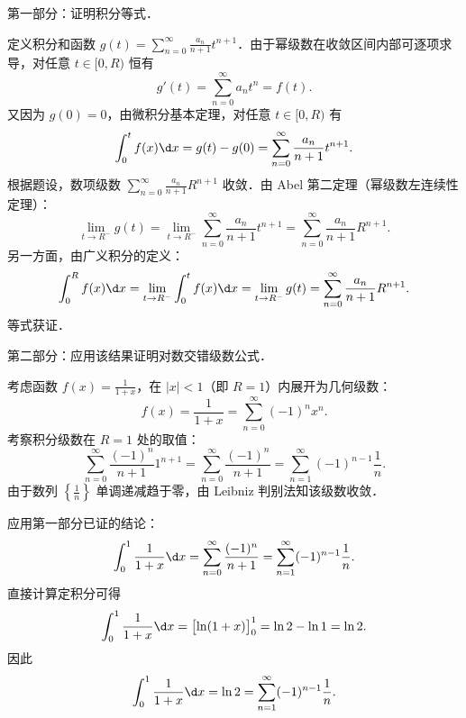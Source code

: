 \begin{myproof}
    第一部分：证明积分等式．

    定义积分和函数 $g(t) = \sum_{n=0}^\infty \frac{a_n}{n+1} t^{n+1}$．由于幂级数在收敛区间内部可逐项求导，对任意 $t \in [0, R)$ 恒有
    \begin{equation}
        g'(t) = \sum_{n=0}^\infty a_n t^n = f(t).
    \end{equation}
    又因为 $g(0) = 0$，由微积分基本定理，对任意 $t \in [0, R)$ 有
    \begin{equation}
        \int_0^t f(x)\d x = g(t) - g(0) = \sum_{n=0}^\infty \frac{a_n}{n+1} t^{n+1}.
    \end{equation}
    根据题设，数项级数 $\sum_{n=0}^\infty \frac{a_n}{n+1} R^{n+1}$ 收敛．由 Abel 第二定理（幂级数左连续性定理）：
    \begin{equation}
        \lim_{t \to R^-} g(t) = \lim_{t \to R^-} \sum_{n=0}^\infty \frac{a_n}{n+1} t^{n+1} = \sum_{n=0}^\infty \frac{a_n}{n+1} R^{n+1}.
    \end{equation}
    另一方面，由广义积分的定义：
    \begin{equation}
        \int_0^R f(x)\d x = \lim_{t \to R^-} \int_0^t f(x)\d x = \lim_{t \to R^-} g(t) = \sum_{n=0}^\infty \frac{a_n}{n+1} R^{n+1}.
    \end{equation}
    等式获证．

    第二部分：应用该结果证明对数交错级数公式．

    考虑函数 $f(x) = \frac{1}{1+x}$，在 $|x| < 1$（即 $R = 1$）内展开为几何级数：
    \begin{equation}
        f(x) = \frac{1}{1+x} = \sum_{n=0}^\infty (-1)^n x^n.
    \end{equation}
    考察积分级数在 $R = 1$ 处的取值：
    \begin{equation}
        \sum_{n=0}^\infty \frac{(-1)^n}{n+1} 1^{n+1} = \sum_{n=0}^\infty \frac{(-1)^n}{n+1} = \sum_{n=1}^\infty (-1)^{n-1} \frac{1}{n}.
    \end{equation}
    由于数列 $\left\{\frac{1}{n}\right\}$ 单调递减趋于零，由 Leibniz 判别法知该级数收敛．

    应用第一部分已证的结论：
    \begin{equation}
        \int_0^1 \frac{1}{1+x}\d x = \sum_{n=0}^\infty \frac{(-1)^n}{n+1} = \sum_{n=1}^\infty (-1)^{n-1}\frac{1}{n}.
    \end{equation}
    直接计算定积分可得
    \begin{equation}
        \int_0^1 \frac{1}{1+x}\d x = \bigl[\ln(1+x)\bigr]_0^1 = \ln 2 - \ln 1 = \ln 2.
    \end{equation}
    因此
    \begin{equation}
        \int_0^1 \frac{1}{1+x}\d x = \ln 2 = \sum_{n=1}^\infty (-1)^{n-1}\frac{1}{n}.
    \end{equation}
\end{myproof}

